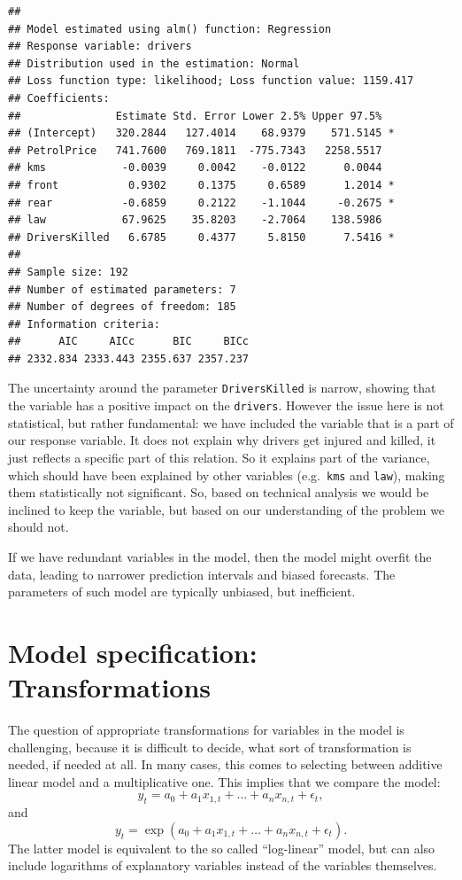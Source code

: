 \documentclass[
]{book}
\theoremstyle{definition}
\theoremstyle{definition}
\theoremstyle{definition}
\theoremstyle{definition}
\theoremstyle{remark}
\begin{document}
\begin{verbatim}
## 
## Model estimated using alm() function: Regression
## Response variable: drivers
## Distribution used in the estimation: Normal
## Loss function type: likelihood; Loss function value: 1159.417
## Coefficients:
##               Estimate Std. Error Lower 2.5% Upper 97.5%  
## (Intercept)   320.2844   127.4014    68.9379    571.5145 *
## PetrolPrice   741.7600   769.1811  -775.7343   2258.5517  
## kms            -0.0039     0.0042    -0.0122      0.0044  
## front           0.9302     0.1375     0.6589      1.2014 *
## rear           -0.6859     0.2122    -1.1044     -0.2675 *
## law            67.9625    35.8203    -2.7064    138.5986  
## DriversKilled   6.6785     0.4377     5.8150      7.5416 *
## 
## Sample size: 192
## Number of estimated parameters: 7
## Number of degrees of freedom: 185
## Information criteria:
##      AIC     AICc      BIC     BICc 
## 2332.834 2333.443 2355.637 2357.237
\end{verbatim}

The uncertainty around the parameter \texttt{DriversKilled} is narrow, showing that the variable has a positive impact on the \texttt{drivers}. However the issue here is not statistical, but rather fundamental: we have included the variable that is a part of our response variable. It does not explain why drivers get injured and killed, it just reflects a specific part of this relation. So it explains part of the variance, which should have been explained by other variables (e.g.~\texttt{kms} and \texttt{law}), making them statistically not significant. So, based on technical analysis we would be inclined to keep the variable, but based on our understanding of the problem we should not.

If we have redundant variables in the model, then the model might overfit the data, leading to narrower prediction intervals and biased forecasts. The parameters of such model are typically unbiased, but inefficient.

\hypertarget{diagnosticsTransformations}{%
\section{Model specification: Transformations}\label{diagnosticsTransformations}}

The question of appropriate transformations for variables in the model is challenging, because it is difficult to decide, what sort of transformation is needed, if needed at all. In many cases, this comes to selecting between additive linear model and a multiplicative one. This implies that we compare the model:
\begin{equation}
    y_t = a_0 + a_1 x_{1,t} + \dots + a_n x_{n,t} + \epsilon_t,
  \label{eq:additiveModel}
\end{equation}
and
\begin{equation}
    y_t = \exp\left(a_0 + a_1 x_{1,t} + \dots + a_n x_{n,t} + \epsilon_t\right) .
  \label{eq:multiplicativeModel}
\end{equation}
The latter model is equivalent to the so called ``log-linear'' model, but can also include logarithms of explanatory variables instead of the variables themselves.
\end{document}
